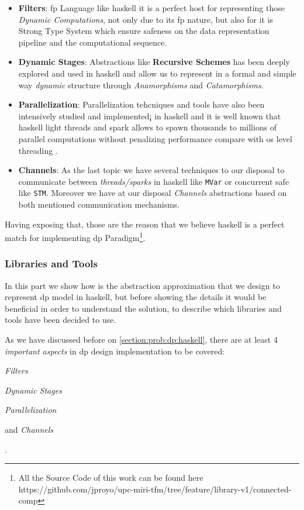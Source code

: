 \documentclass[preprint]{elsarticle}
\begin{document}
\begin{itemize}
    \item \textbf{Filters}: \acrfull{fp} Language like \acrshort{haskell} it is a perfect host for representing those \textit{Dynamic Computations}, not only due to its \acrshort{fp} nature, but also for it is Strong Type System which ensure safeness on the data representation pipeline and the computational sequence.
    \item \textbf{Dynamic Stages}\label{dyn:stage}: Abstractions like \textbf{Recursive Schemes} \citep{lenses} has been deeply explored and used in \acrshort{haskell} and allow us to represent in a formal and simple way \textit{dynamic} structure through \textit{Anamorphisms} and \textit{Catamorphisms}.
    \item \textbf{Parallelization}: Parallelization tehcniques and tools have also been intensively studied and implemented¡ in \acrshort{haskell} \citep{monadpar} and it is well known that \acrshort{haskell} light threads and spark allows to spawn thousands to millions of parallel computations without penalizing performance compare with \acrfull{os} level threading \citep{parallelbook}.
    \item \textbf{Channels}: As the last topic we have several techniques to our disposal to communicate between \textit{threads/sparks} in \acrshort{haskell} like \texttt{MVar} or concurrent safe like \texttt{STM}. Moreover we have at our disposal \textit{Channels} abstractions based on both mentioned communication mechanisms. 
\end{itemize}

Having exposing that, those are the reason that we believe \acrshort{haskell} is a perfect match for implementing \acrshort{dp} Paradigm\footnote{All the Source Code of this work can be found here https://github.com/jproyo/upc-miri-tfm/tree/feature/library-v1/connected-comp}.

\subsubsection{\textbf{Libraries and Tools}}\label{sub:lib:tools}
In this part we show how is the abstraction approximation that we design to represent \acrshort{dp} model in \acrshort{haskell}, but before showing the details it would be beneficial in order to understand the solution, to describe which libraries and tools have been decided to use.

As we have discussed before on \autoref{section:prob:dp:haskell}, there are at least 4 \emph{important aspects} in \acrshort{dp} design implementation to be covered: \begin{inparaenum}[i\upshape)]
\item \emph{Filters}
\item \emph{Dynamic Stages}
\item \emph{Parallelization}
\item and \emph{Channels}
 \end{inparaenum}.
\end{document}

